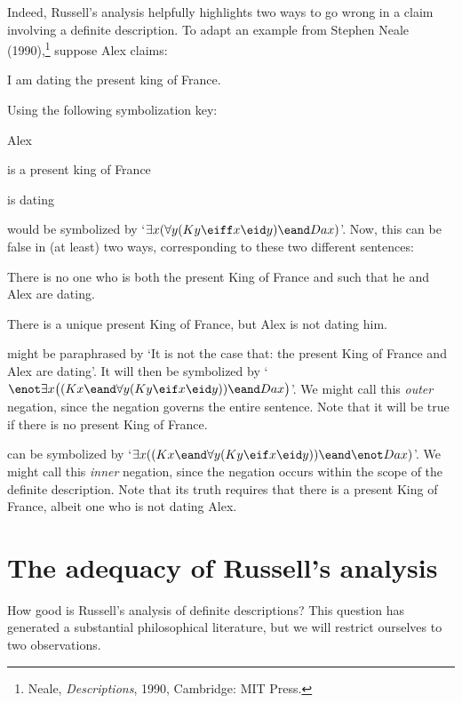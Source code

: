 Indeed, Russell's analysis helpfully highlights two ways to go wrong in a claim involving a definite description. To adapt an example from Stephen Neale (1990),\footnote{Neale, \emph{Descriptions}, 1990, Cambridge: MIT Press.}  suppose Alex claims:
	\begin{samplesent}
		\item\label{sent:kingdate} I am dating the present king of France.
	\end{samplesent}
Using the following symbolization key:
	\begin{ekey}
		\item[a] Alex
		\item[Kx]  is a present king of France
		\item[Dxy]  is dating 
	\end{ekey}
 would be symbolized by `$\exists x (\forall y(Ky \eiff  x \eid y) \eand Dax)$'. Now, this can be false in (at least) two ways, corresponding to these two different sentences:
	\begin{samplesent}
		\item\label{sent:outernegation} There is no one who is both the present King of France and  such that he and Alex are dating.
		\item\label{sent:innernegation} There is a unique present King of France, but Alex is not dating him.
	\end{samplesent}
 might be paraphrased by `It is not the case that: the present King of France and Alex are dating'. It will then be symbolized by `$\enot \exists x\bigl((Kx \eand \forall y(Ky \eif  x \eid y)) \eand Dax \bigr)$'. We might call this \emph{outer} negation, since the negation governs the entire sentence. Note that it will be true if there is no present King of France.

 can be symbolized by `$\exists x ((Kx \eand \forall y(Ky \eif x \eid y)) \eand \enot Dax)$'. We might call this \emph{inner} negation, since the negation occurs within the scope of the definite description. Note that its truth requires that there is a present King of France, albeit one who is not dating Alex.

\section{The adequacy of Russell's analysis}
How good is Russell's analysis of definite descriptions? This question has generated a substantial philosophical literature, but we will restrict ourselves to two observations.


